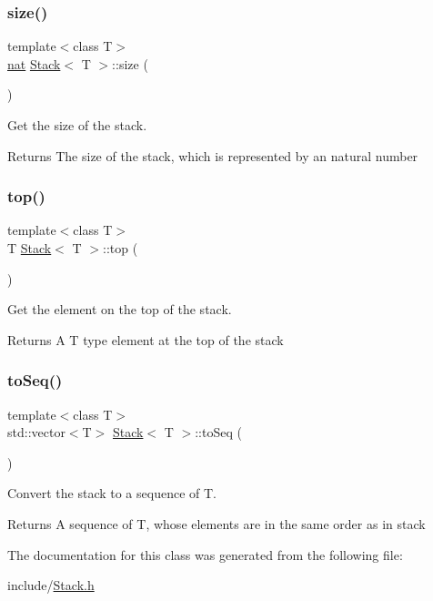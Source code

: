 \subsubsection{\texorpdfstring{size()}{size()}}
{\footnotesize\ttfamily template$<$class T$>$ \\
\hyperlink{_card_types_8h_a56638ee9d162e8cce3a15f92d2023d6e}{nat} \hyperlink{class_stack}{Stack}$<$ T $>$\+::size (\begin{DoxyParamCaption}{ }\end{DoxyParamCaption})}



Get the size of the stack. 

\begin{DoxyReturn}{Returns}
The size of the stack, which is represented by an natural number 
\end{DoxyReturn}
\mbox{\label{class_stack_ad461f6de40c8672dbf743068f4515061}} 
\subsubsection{\texorpdfstring{top()}{top()}}
{\footnotesize\ttfamily template$<$class T$>$ \\
T \hyperlink{class_stack}{Stack}$<$ T $>$\+::top (\begin{DoxyParamCaption}{ }\end{DoxyParamCaption})}



Get the element on the top of the stack. 

\begin{DoxyReturn}{Returns}
A T type element at the top of the stack 
\end{DoxyReturn}
\mbox{\label{class_stack_a928be02635c7f5bf2bab3699aee07f52}} 
\subsubsection{\texorpdfstring{to\+Seq()}{toSeq()}}
{\footnotesize\ttfamily template$<$class T$>$ \\
std\+::vector$<$T$>$ \hyperlink{class_stack}{Stack}$<$ T $>$\+::to\+Seq (\begin{DoxyParamCaption}{ }\end{DoxyParamCaption})}



Convert the stack to a sequence of T. 

\begin{DoxyReturn}{Returns}
A sequence of T, whose elements are in the same order as in stack 
\end{DoxyReturn}


The documentation for this class was generated from the following file\+:\begin{DoxyCompactItemize}
\item 
include/\hyperlink{_stack_8h}{Stack.\+h}\end{DoxyCompactItemize}
